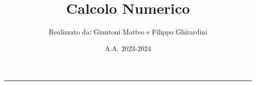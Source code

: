 \documentclass[a4paper,10pt]{article}
\title{\textbf{Calcolo Numerico}}
\author{Realizzato da: Giuntoni Matteo e Filippo Ghirardini}
\date{A.A. 2023-2024}
\theoremstyle{remark}
\theoremstyle{definition}
\theoremstyle{plain}
\theoremstyle{definition}
\theoremstyle{definition}
\theoremstyle{definition}
\theoremstyle{plain}
\theoremstyle{plain}
\begin{document}

\tableofcontents
\newpage
\maketitle
\begin{center}
    \vspace{-20pt}
    \rule{11cm}{.1pt} 
\end{center}
\newpage







\end{document}
